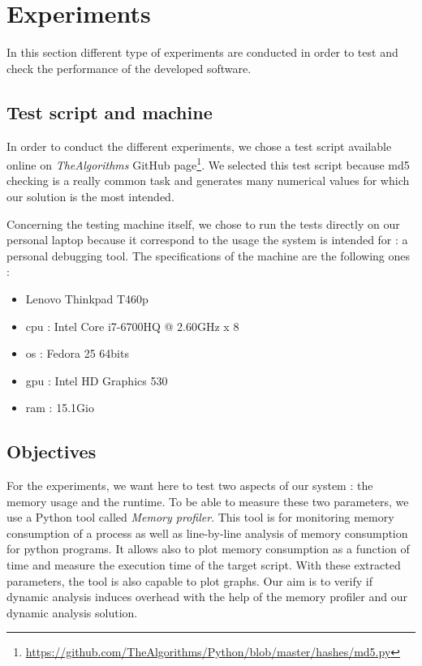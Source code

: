

\chapter{Experiments} %
\label{chap:experiments}

In this section different type of experiments are conducted in order to test and check the performance of the developed software.

\section{Test script and machine}
In order to conduct the different experiments, we chose a test script available online on \textit{TheAlgorithms} GitHub page\footnote{\url{https://github.com/TheAlgorithms/Python/blob/master/hashes/md5.py}}. We selected this test script because \gls{md5} checking is a really common task and generates many numerical values for which our solution is the most intended. 

Concerning the testing machine itself, we chose to run the tests directly on our personal laptop because it correspond to the usage the system is intended for : a personal debugging tool. The specifications of the machine are the following ones :
\begin{itemize}
  \item Lenovo Thinkpad T460p
  \item \gls{cpu} : Intel Core i7-6700HQ @ 2.60GHz x 8
  \item \gls{os} : Fedora 25 64bits
  \item \gls{gpu} : Intel HD Graphics 530
  \item \gls{ram} : 15.1Gio
\end{itemize}

\section{Objectives}
For the experiments, we want here to test two aspects of our system : the memory usage and the runtime. To be able to measure these two parameters, we use a Python tool called \textit{Memory profiler}. This tool is for monitoring memory consumption of a process as well as line-by-line analysis of memory consumption for python programs. It allows also to plot memory consumption as a function of time and measure the execution time of the target script. With these extracted parameters, the tool is also capable to plot graphs. Our aim is to verify if dynamic analysis induces overhead with the help of the memory profiler and our dynamic analysis solution.

